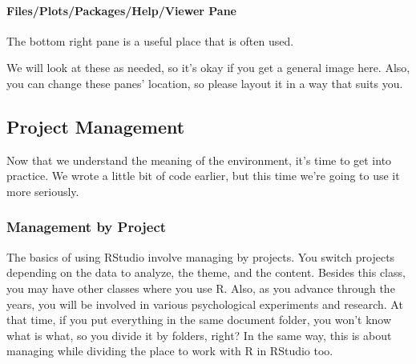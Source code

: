 \documentclass{ltjsbook}
\begin{document}
\paragraph{Files/Plots/Packages/Help/Viewer Pane}
The bottom right pane is a useful place that is often used.

We will look at these as needed, so it's okay if you get a general image here. Also, you can change these panes' location, so please layout it in a way that suits you.


\subsection{Project Management}
Now that we understand the meaning of the environment, it's time to get into practice. We wrote a little bit of code earlier, but this time we're going to use it more seriously.
\subsubsection{Management by Project}
\label{UnderProject}

The basics of using RStudio involve managing by projects. You switch projects depending on the data to analyze, the theme, and the content. Besides this class, you may have other classes where you use R. Also, as you advance through the years, you will be involved in various psychological experiments and research. At that time, if you put everything in the same document folder, you won't know what is what, so you divide it by folders, right? In the same way, this is about managing while dividing the place to work with R in RStudio too.
\end{document}
